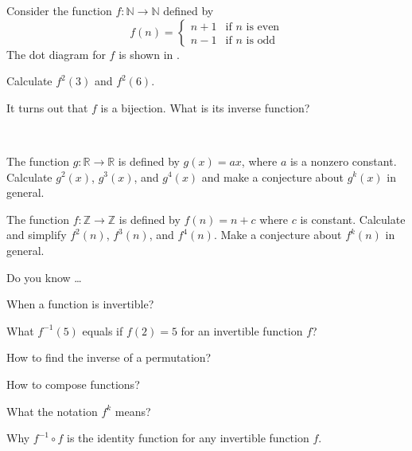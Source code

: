 \begin{exer}
\label{exer_inverse_piecewise}
    Consider the function $f: \mathbb{N} \to \mathbb{N}$ defined by 
        $$f(n) =\left\{ \begin{array} {cl} 
        n+1 & \text{if } n \text{ is even} \\
        n-1 & \text{if } n \text{ is odd} 
        \end{array} \right.$$  The dot diagram for $f$ is shown in .
            \begin{exerpart}
                \item Calculate $f^2(3)$ and $f^2(6)$.
                \item It turns out that $f$ is a bijection. What is its inverse function?
            \end{exerpart}
\end{exer}

\begin{exer}[\exerU] %
\label{exer_iterates_linear}
~
    \begin{exerpart}
        \item The function $g: \mathbb{R} \to \mathbb{R}$ is defined by $g(x) = ax$, where $a$ is a nonzero constant.  Calculate  $g^2(x)$, $g^3(x)$, and $g^4(x)$ and make a conjecture about $g^k(x)$ in general.
        \item The function $f: \mathbb{Z} \to \mathbb{Z}$ is defined by $f(n) = n + c$ where $c$ is constant. Calculate and simplify $f^2(n)$, $f^3(n)$, and $f^4(n)$.  Make a conjecture about $f^k(n)$ in general.
    \end{exerpart}
\end{exer}

\begin{exer}[\exerR] %
\label{exer_dyk_inverses}
    Do you know \ldots
        \begin{exerpart}
            \item When a function is invertible?\item What $f^{-1}(5)$ equals if $f(2)=5$ for an invertible function $f$?
            \item How to find the inverse of a permutation?
            \item How to compose functions?
            \item What the notation $f^k$ means?
            \item Why $f^{-1} \circ f$ is the identity function for any invertible function $f$.
        \end{exerpart}
\end{exer}


